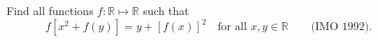 Find all functions $f : \mathbb{R} \mapsto \mathbb{R}$ such that
\[ f\left[x^2 + f(y)\right] = y + [f(x)]^2 \quad\text{for all } x, y \in \mathbb{R} \qquad \text{(IMO 1992).} \]
